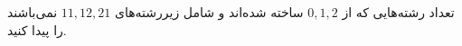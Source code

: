 \EXERCISE
تعداد رشته‌هایی که از
$0, 1, 2$
ساخته شده‌اند و شامل زیررشته‌های
$11, 12, 21$
نمی‌باشند را پیدا کنید.